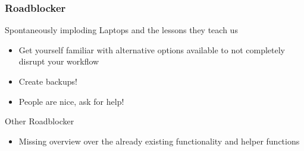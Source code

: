 \begin{frame}
	\frametitle{Roadblocker}
	\Large
	Spontaneously imploding Laptops and the lessons they teach us
	\large
	\begin{itemize}
		\item Get yourself familiar with alternative options available to not completely disrupt your workflow
		\item Create backups!
		\item People are nice, ask for help!
	\end{itemize}

	\Large
	Other Roadblocker
	\large
	\begin{itemize}
		\item<1->  Missing overview over the already existing functionality and helper functions
	\end{itemize}
	
\end{frame}




